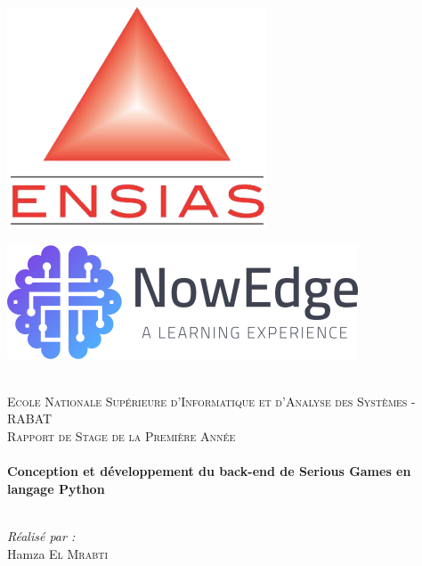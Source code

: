 \begin{titlepage}
\begin{center}

\begin{minipage}{0.45\textwidth} 
\begin{flushleft}
    \includegraphics[scale = 0.4]{Images/ensias.png}
\end{flushleft}
\end{minipage}
\begin{minipage}{0.48\textwidth} 
\begin{flushright}
    \includegraphics[scale = 0.5]{Images/nowedge.png}
\end{flushright}
\end{minipage}
\\[1.9cm] 
 


\textsc{\Large Ecole Nationale Supérieure d’Informatique et d’Analyse des Systèmes - RABAT }\\[2cm]

\textsc{\Large Rapport de Stage de la Première Année
}\\[0.5cm]

\HRule \\[0.4cm]

{\huge \bfseries   
Conception et développement du back-end de Serious Games en langage Python
 \\[0.4cm] }
\HRule \\
[2cm]
\begin{minipage}{0.4\textwidth}
\begin{flushleft} \large
\emph{Réalisé par :}\\
Hamza \textsc{El Mrabti}\\ [1cm]


\end{flushleft}
\end{minipage}
\end{center}
\end{titlepage}
